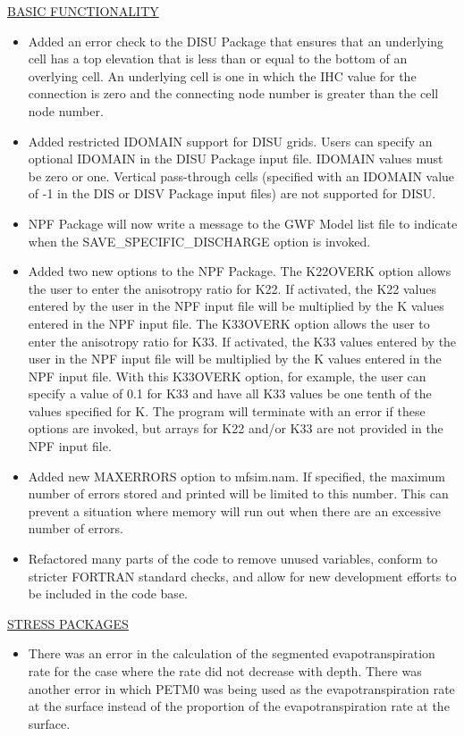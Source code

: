 \documentclass[11pt,twoside,twocolumn]{usgsreport}
\begin{document}
\begin{itemize}
\underline{BASIC FUNCTIONALITY}
\begin{itemize}
\item Added an error check to the DISU Package that ensures that an underlying cell has a top elevation that is less than or equal to the bottom of an overlying cell.  An underlying cell is one in which the IHC value for the connection is zero and the connecting node number is greater than the cell node number.
\item Added restricted IDOMAIN support for DISU grids.  Users can specify an optional IDOMAIN in the DISU Package input file.  IDOMAIN values must be zero or one.  Vertical pass-through cells (specified with an IDOMAIN value of -1 in the DIS or DISV Package input files) are not supported for DISU.   
\item NPF Package will now write a message to the GWF Model list file to indicate when the SAVE\_SPECIFIC\_DISCHARGE option is invoked.
\item Added two new options to the NPF Package.  The K22OVERK option allows the user to enter the anisotropy ratio for K22.  If activated, the K22 values entered by the user in the NPF input file will be multiplied by the K values entered in the NPF input file.  The K33OVERK option allows the user to enter the anisotropy ratio for K33.  If activated, the K33 values entered by the user in the NPF input file will be multiplied by the K values entered in the NPF input file.  With this K33OVERK option, for example, the user can specify a value of 0.1 for K33 and have all K33 values be one tenth of the values specified for K.  The program will terminate with an error if these options are invoked, but arrays for K22 and/or K33 are not provided in the NPF input file.
\item Added new MAXERRORS option to mfsim.nam.  If specified, the maximum number of errors stored and printed will be limited to this number.  This can prevent a situation where memory will run out when there are an excessive number of errors.
\item Refactored many parts of the code to remove unused variables, conform to stricter FORTRAN standard checks, and allow for new development efforts to be included in the code base.
\end{itemize}

\underline{STRESS PACKAGES}
\begin{itemize}
\item There was an error in the calculation of the segmented evapotranspiration rate for the case where the rate did not decrease with depth.  There was another error in which PETM0 was being used as the evapotranspiration rate at the surface instead of the proportion of the evapotranspiration rate at the surface.
\end{itemize}


\end{itemize}
\end{document}
